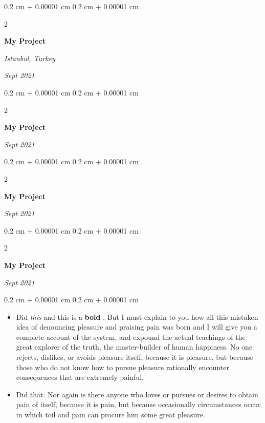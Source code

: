 \documentclass[10pt, letterpaper]{article}
\newenvironment{highlights}{
    \begin{itemize}[
        topsep=0.10 cm,
        parsep=0.10 cm,
        partopsep=0pt,
        itemsep=0pt,
        leftmargin=0.4 cm + 10pt
    ]
}{
    \end{itemize}
} %
\newenvironment{onecolentry}{
    \begin{adjustwidth}{
        0.2 cm + 0.00001 cm
    }{
        0.2 cm + 0.00001 cm
    }
}{
    \end{adjustwidth}
} %
\newenvironment{twocolentry}[2][]{
    \onecolentry
    \def\secondColumn{#2}
    \setcolumnwidth{\fill, 4.5 cm}
    \begin{paracol}{2}
}{
    \switchcolumn \raggedleft \secondColumn
    \end{paracol}
    \endonecolentry
} %
\let\hrefWithoutArrow\href
\renewcommand{\href}[2]{\hrefWithoutArrow{#1}{\ifthenelse{\equal{#2}{}}{ }{#2 }\raisebox{.15ex}{\footnotesize \faExternalLink*}}}
\begin{document}
        \vspace{0.2 cm}

        \begin{twocolentry}{
        \textit{Istanbul, Turkey}    
            
        \textit{Sept 2021}}
            \textbf{My Project}
        \end{twocolentry}



        \vspace{0.2 cm}

        \begin{twocolentry}{
            
            
        \textit{Sept 2021}}
            \textbf{My Project}
        \end{twocolentry}



        \vspace{0.2 cm}

        \begin{twocolentry}{
            
            
        \textit{Sept 2021}}
            \textbf{My Project}
        \end{twocolentry}



        \vspace{0.2 cm}

        \begin{twocolentry}{
            
            
        \textit{Sept 2021}}
            \textbf{My Project}
        \end{twocolentry}

        \vspace{0.10 cm}
        \begin{onecolentry}
            \begin{highlights}
                \item Did \textit{this} and this is a \textbf{bold} \href{https://example.com}{link}. But I must explain to you how all this mistaken idea of denouncing pleasure and praising pain was born and I will give you a complete account of the system, and expound the actual teachings of the great explorer of the truth, the master-builder of human happiness. No one rejects, dislikes, or avoids pleasure itself, because it is pleasure, but because those who do not know how to pursue pleasure rationally encounter consequences that are extremely painful.
                \item Did that. Nor again is there anyone who loves or pursues or desires to obtain pain of itself, because it is pain, but because occasionally circumstances occur in which toil and pain can procure him some great pleasure.
            \end{highlights}
        \end{onecolentry}
\end{document}
